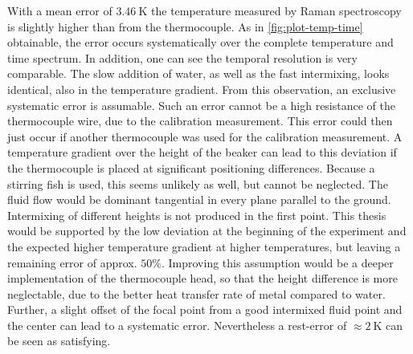 With a mean error of $3.46~\mathrm{K}$ the temperature measured by Raman spectroscopy is slightly higher than from the thermocouple. As in \autoref{fig:plot-temp-time} obtainable, the error occurs systematically over the complete temperature and time spectrum. In addition, one can see the temporal resolution is very comparable. The slow addition of water, as well as the fast intermixing, looks identical, also in the temperature gradient. From this observation, an exclusive systematic error is assumable. Such an error cannot be a high resistance of the thermocouple wire, due to the calibration measurement. This error could then just occur if another thermocouple was used for the calibration measurement. A temperature gradient over the height of the beaker can lead to this deviation if the thermocouple is placed at significant positioning differences. Because a stirring fish is used, this seems unlikely as well, but cannot be neglected. The fluid flow would be dominant tangential in every plane parallel to the ground. Intermixing of different heights is not produced in the first point. This thesis would be supported by the low deviation at the beginning of the experiment and the expected higher temperature gradient at higher temperatures, but leaving a remaining error of approx. $50\%$. Improving this assumption would be a deeper implementation of the thermocouple head, so that the height difference is more neglectable, due to the better heat transfer rate of metal compared to water. Further, a slight offset of the focal point from a good intermixed fluid point and the center can lead to a systematic error. Nevertheless a rest-error of $\approx 2~\mathrm{K}$ can be seen as satisfying.